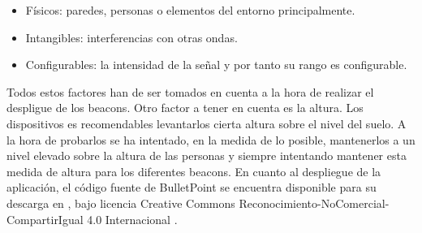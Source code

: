 \begin{itemize}
\item Físicos:  paredes, personas o elementos del entorno principalmente.
\item Intangibles: interferencias con otras ondas.
\item Configurables: la intensidad de la señal y por tanto su rango es configurable.
\end{itemize}


Todos estos factores han de ser tomados en cuenta a la hora de realizar el despligue de los beacons. Otro factor a tener en cuenta es la altura. Los dispositivos es recomendables levantarlos cierta altura sobre el nivel del suelo. A la hora de probarlos se ha intentado, en la medida de lo posible, mantenerlos a un nivel elevado sobre la altura de las personas y siempre intentando mantener esta medida de altura para los diferentes beacons. En cuanto al despliegue de la aplicación, el código fuente de BulletPoint se encuentra disponible para su descarga en \cite{URL::repositorioAplicacion}, bajo licencia Creative Commons Reconocimiento-NoComercial-CompartirIgual 4.0 Internacional \cite{URL::licencia}.





